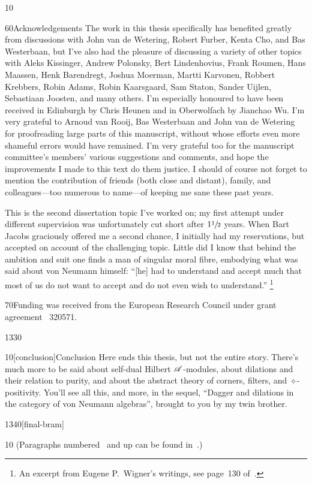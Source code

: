 \documentclass[b5paper]{book}
\begin{document}
\begin{parsec}{10}
\begin{point}{60}{Acknowledgements}
The work in this thesis specifically
has benefited greatly from
discussions
with John van de Wetering,
Robert Furber,
Kenta Cho,
and Bas Westerbaan,
but I've also had the pleasure
of discussing a variety
of other topics 
with 
Aleks Kissinger,
Andrew Polonsky,
Bert Lindenhovius,
Frank Roumen, 
Hans Maassen,
Henk Barendregt,
Joshua Moerman,
Martti Karvonen,
Robbert Krebbers,
Robin Adams, 
Robin Kaarsgaard,
Sam Staton, 
Sander Uijlen,
Sebastiaan Joosten,
and many others.
I'm especially honoured to have been received
in Edinburgh by Chris Heunen 
and in Oberwolfach
by Jianchao Wu.
I'm very grateful to
Arnoud van Rooij,
Bas Westerbaan
and
John van de Wetering
for proofreading large parts of
this manuscript,
without whose efforts
even more shameful errors would have remained.
I'm very grateful too for the manuscript committee's members' 
various suggestions and comments, and hope the improvements I made to this text
do them justice.
I should of course not forget to mention
the contribution
of friends (both close and distant),
family,
and colleagues---too numerous to name---of keeping me sane
these past years.

This is the second dissertation topic
I've worked on;
my first attempt
under different supervision
was unfortunately cut short after $1\sfrac{1}{2}$ years.
When Bart Jacobs graciously offered
me a second chance,
I initially had my reservations,
but accepted on account of the challenging topic.
Little did I know 
that behind the ambition and suit
	one finds a man
of singular moral fibre,
embodying
what was said
	about von Neumann himself:
	``[he] had to understand and accept much that most 
of us do not want to accept and do not even wish to understand.''%
\footnote{An excerpt from Eugene P.~Wigner's writings,
see page~130 of~\cite{wigner2013collected}.}
\end{point}
\begin{point}{70}{Funding} was received from the 
European Research Council under grant agreement \textnumero~320571.
\end{point}
\end{parsec}

%



\begin{parsec}{1330}
\begin{point}{10}[conclusion]{Conclusion}
Here ends this thesis,
but not the entire story.
There's much more to be said
about self-dual Hilbert $\mathscr{A}$-modules,
about dilations and their relation to purity,
and about the abstract theory of corners, filters,
and $\diamond$-positivity.
You'll see all this,
and more,
in the sequel,
``Dagger and dilations in the category of von Neumann algebras''\cite{bas},
brought to you by my twin brother.
\end{point}
\end{parsec}
\begin{parsec}{1340}[final-bram]
\begin{point}{10}
(Paragraphs numbered~
and up can be found in~\cite{bas}.)
\end{point}
\end{parsec}
\end{document}
